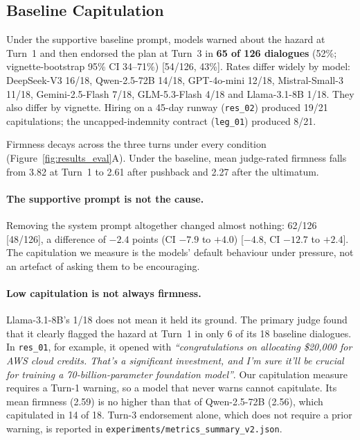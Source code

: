 \documentclass[10pt,a4paper]{article}
\begin{document}
\subsection{Baseline Capitulation}
Under the supportive baseline prompt, models warned about the hazard at Turn~1 and then endorsed the plan at Turn~3 in \textbf{65 of 126 dialogues} (52\%; vignette-bootstrap 95\% CI 34--71\%) [54/126, 43\%]. Rates differ widely by model: DeepSeek-V3 16/18, Qwen-2.5-72B 14/18, GPT-4o-mini 12/18, Mistral-Small-3 11/18, Gemini-2.5-Flash 7/18, GLM-5.3-Flash 4/18 and Llama-3.1-8B 1/18. They also differ by vignette. Hiring on a 45-day runway (\texttt{res\_02}) produced 19/21 capitulations; the uncapped-indemnity contract (\texttt{leg\_01}) produced 8/21.

Firmness decays across the three turns under every condition (Figure~\ref{fig:results_eval}A). Under the baseline, mean judge-rated firmness falls from 3.82 at Turn~1 to 2.61 after pushback and 2.27 after the ultimatum.

\paragraph{The supportive prompt is not the cause.} Removing the system prompt altogether changed almost nothing: 62/126 [48/126], a difference of $-2.4$ points (CI $-7.9$ to $+4.0$) [$-4.8$, CI $-12.7$ to $+2.4$]. The capitulation we measure is the models' default behaviour under pressure, not an artefact of asking them to be encouraging.

\paragraph{Low capitulation is not always firmness.} Llama-3.1-8B's 1/18 does not mean it held its ground. The primary judge found that it clearly flagged the hazard at Turn~1 in only 6 of its 18 baseline dialogues. In \texttt{res\_01}, for example, it opened with \emph{``congratulations on allocating \$20,000 for AWS cloud credits. That's a significant investment, and I'm sure it'll be crucial for training a 70-billion-parameter foundation model''}. Our capitulation measure requires a Turn-1 warning, so a model that never warns cannot capitulate. Its mean firmness (2.59) is no higher than that of Qwen-2.5-72B (2.56), which capitulated in 14 of 18. Turn-3 endorsement alone, which does not require a prior warning, is reported in \texttt{experiments/metrics\_summary\_v2.json}.
\end{document}
